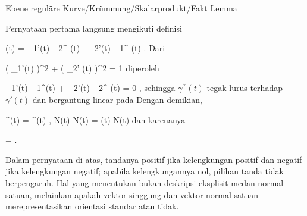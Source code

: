 {Ebene reguläre Kurve/Krümmung/Skalarprodukt/Fakt}
{Lemma}
{}
{

\faktzusatz {}
\faktzusatz {}

}
{

Pernyataan pertama langsung mengikuti definisi

\mavergleichskettedisp
{\vergleichskette
{ \kappa(t)
}
{ =} { \gamma_1'(t) \gamma_2^{\prime \prime} (t) - \gamma_2'(t) \gamma_1^{\prime \prime} (t)
}
{ } {
}
{ } {
}
{ } {
}
}
{}{}{.}
Dari

\mavergleichskettedisp
{\vergleichskette
{ \left(  \gamma_1'(t)  \right)^2 +  \left(  \gamma_2' (t)  \right)^2
}
{ =} { 1
}
{ } {
}
{ } {
}
{ } {
}
}
{}{}{}
diperoleh

\mavergleichskettedisp
{\vergleichskette
{ \gamma_1'(t) \gamma_1^{\prime \prime}(t) + \gamma_2'(t) \gamma_2^{\prime \prime} (t)
}
{ =} { 0
}
{ } {
}
{ } {
}
{ } {
}
}
{}{}{,}
sehingga $\gamma^{\prime \prime}(t)$ tegak lurus terhadap $\gamma'(t)$ dan bergantung linear pada
 Dengan demikian,

\mavergleichskettedisp
{\vergleichskette
{ \gamma^{\prime \prime}(t)
}
{ =} { \left\langle  \gamma^{\prime \prime}(t) ,  N(t)  \right\rangle  N(t)
}
{ =} { \kappa(t) N(t)
}
{ } {
}
{ } {
}
}
{}{}{}
dan karenanya

\mavergleichskettedisp
{\vergleichskette
{  \Vert
}
{ =} { 
}
{ } {
}
{ } {
}
{ } {
}
}
{}{}{.}

}

Dalam pernyataan di atas, tandanya positif jika kelengkungan positif dan negatif jika kelengkungan negatif; apabila kelengkungannya nol, pilihan tanda tidak berpengaruh. Hal yang menentukan bukan deskripsi eksplisit medan normal satuan, melainkan apakah vektor singgung dan vektor normal satuan merepresentasikan orientasi standar atau tidak.

